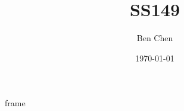 \documentclass{beamer}
\title{SS149}
\author{Ben Chen}
\institute{Dept of Computer Science and Engineering, SUSTech}
\date{\today}
\begin{document}
    \frame{\titlepage}
    \begin{frame}
        frame
    \end{frame}
\end{document}
